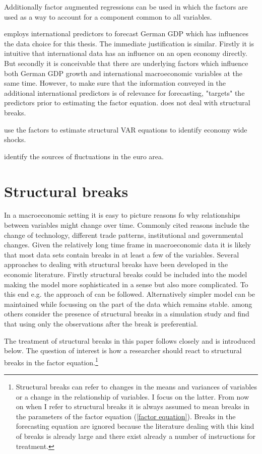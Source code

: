 \documentclass[12pt]{article}
\begin{document}
Additionally factor augmented regressions can be used in which the factors are used as a way to account for a component common to all variables.

\citet{schumacher2010factor} employs international predictors to forecast German GDP which has influences the data choice for this thesis. The immediate justification is similar. Firstly it is intuitive that international data has an influence on an open economy directly. But secondly it is conceivable that there are underlying factors which influence both German GDP growth and international macroeconomic variables at the same time. However, to make sure that the information conveyed in the additional international predictors is of relevance for forecasting, \citet{schumacher2010factor} "targets" the predictors prior to estimating the factor equation. \citet{schumacher2010factor} does not deal with structural breaks.

\citet{forni1998let} use the factors to estimate structural VAR equations to identify economy wide shocks.


\citet{eickmeier2006synchronized} identify the sources of fluctuations in the euro area. %

\section{Structural breaks}
In a macroeconomic setting it is easy to picture reasons fo why relationships between variables might change over time. Commonly cited reasons include the change of technology, different trade patterns, institutional and governmental changes. Given the relatively long time frame in macroeconomic data it is likely that most data sets contain breaks in at least a few of the variables. Several approaches to dealing with structural breaks have been developed in the economic literature. Firstly structural breaks could be included into the model making the model more sophisticated in a sense but also more complicated. To this end e.g. the approach of \citet{bai2003computation} can be followed. Alternatively simpler model can be maintained while focussing on the part of the data which remains stable. \citet{banerjee2007forecasting} among others consider the presence of structural breaks in a simulation study and find that using only the observations after the break is preferential.

The treatment of structural breaks in this paper follows \citet{breitung2011testing} closely and is introduced below. The question of interest is how a researcher should react to structural breaks in the factor equation.\footnote{Structural breaks can refer to changes in the means and variances of variables or a change in the relationship of variables. I focus on the latter. From now on when I refer to structural breaks it is always assumed to mean breaks in the parameters of the factor equation (\ref{factor equation}). Breaks in the forecasting equation are ignored because the literature dealing with this kind of breaks is already large and there exist already a number of instructions for treatment.}
\end{document}
